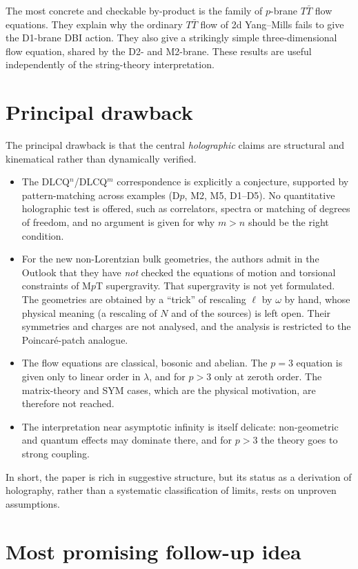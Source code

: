 \documentclass[11pt]{article}
\newcommand{\TTbar}{T\bar{T}}
\begin{document}
The most concrete and checkable by-product is the family of $p$-brane $\TTbar$ flow equations.
They explain why the ordinary $\TTbar$ flow of 2d Yang--Mills fails to give the D1-brane DBI action. They also give a strikingly simple three-dimensional flow equation, shared by the D2- and M2-brane. These results are useful independently of the string-theory interpretation.

\section{Principal drawback}

The principal drawback is that the central \emph{holographic} claims are structural and kinematical rather than dynamically verified.
\begin{itemize}
\item The DLCQ$^n$/DLCQ$^m$ correspondence is explicitly a conjecture, supported by pattern-matching across examples (D$p$, M2, M5, D1--D5). No quantitative holographic test is offered, such as correlators, spectra or matching of degrees of freedom, and no argument is given for why $m>n$ should be the right condition.
\item For the new non-Lorentzian bulk geometries, the authors admit in the Outlook that they have \emph{not} checked the equations of motion and torsional constraints of M$p$T supergravity. That supergravity is not yet formulated. The geometries are obtained by a ``trick'' of rescaling $\ell$ by $\omega$ by hand, whose physical meaning (a rescaling of $N$ and of the sources) is left open. Their symmetries and charges are not analysed, and the analysis is restricted to the Poincar\'e-patch analogue.
\item The flow equations are classical, bosonic and abelian. The $p=3$ equation is given only to linear order in $\lambda$, and for $p>3$ only at zeroth order. The matrix-theory and SYM cases, which are the physical motivation, are therefore not reached.
\item The interpretation near asymptotic infinity is itself delicate: non-geometric and quantum effects may dominate there, and for $p>3$ the theory goes to strong coupling.
\end{itemize}
In short, the paper is rich in suggestive structure, but its status as a derivation of holography, rather than a systematic classification of limits, rests on unproven assumptions.

\section{Most promising follow-up idea}
\end{document}
